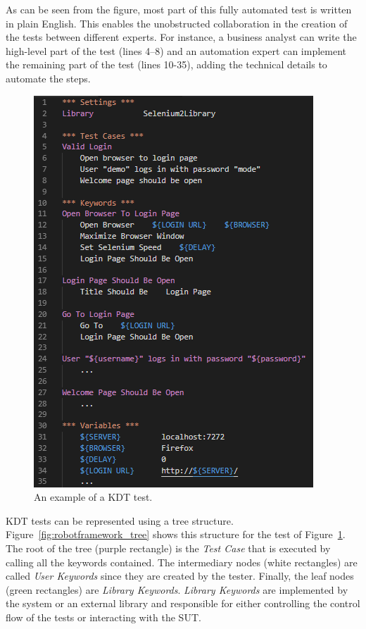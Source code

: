As can be seen from the figure, most part of this fully automated test is written in plain English. This enables the unobstructed collaboration in the creation of the tests between different experts. For instance, a business analyst can write the high-level part of the test (lines 4--8) and an automation expert can implement the remaining part of the test (lines 10-35), adding the technical details to automate the steps.

\begin{figure}[t!]
\centering
\includegraphics[width=\columnwidth]{figures/evolution/robotframework_script.png}
\caption{An example of a KDT test.}
\label{fig:robotframework_script}
\end{figure}


KDT tests can be represented using a tree structure. Figure~\ref{fig:robotframework_tree} shows this structure for the test of Figure~\ref{fig:robotframework_script}. The root of the tree (purple rectangle) is the \emph{Test Case} that is executed by calling all the keywords contained. The intermediary nodes (white rectangles) are called \emph{User Keywords} since they are created by the tester. Finally, the leaf nodes (green rectangles) are \emph{Library Keywords}. \emph{Library Keywords} are implemented by the system or an external library and responsible for either controlling the control flow of the tests or interacting with the SUT.

